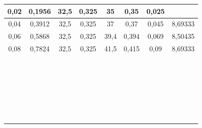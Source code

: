 \begin{tabular}{|*{8}{c|}}
\hline 
0,02 & 0,1956 & 32,5 & 0,325 & 35 & 0,35 & 0,025 &  \\ \hline 
 0,04 & 0,3912 & 32,5 & 0,325 & 37 & 0,37 & 0,045 & 8,69333 \\ \hline 
 0,06 & 0,5868 & 32,5 & 0,325 & 39,4 & 0,394 & 0,069 & 8,50435 \\ \hline 
 0,08 & 0,7824 & 32,5 & 0,325 & 41,5 & 0,415 & 0,09 & 8,69333 \\ \hline 
  &  &  &  &  &  &  &  \\ \hline 
  &  &  &  &  &  &  &  \\ \hline 
  &  &  &  &  &  &  &  \\ \hline 
  &  &  &  &  &  &  &  \\ \hline 
  &  &  &  &  &  &  &  \\ \hline 
  &  &  &  &  &  &  &  \\ \hline 
  &  &  &  &  &  &  &  \\ \hline 
  &  &  &  &  &  &  &  \\ \hline 
  &  &  &  &  &  &  &  \\ \hline 
  &  &  &  &  &  &  &  \\ \hline 
  &  &  &  &  &  &  &  \\ \hline 
  &  &  &  &  &  &  &  \\ \hline 
  &  &  &  &  &  &  &  \\ \hline 
  &  &  &  &  &  &  &  \\ \hline 
  &  &  &  &  &  &  &  \\ \hline 
  &  &  &  &  &  &  &  \\ \hline 
  &  &  &  &  &  &  &  \\ \hline 
  &  &  &  &  &  &  &  \\ \hline 
  &  &  &  &  &  &  &  \\ \hline 
  &  &  &  &  &  &  &  \\ \hline 
  &  &  &  &  &  &  &  \\ \hline 
  &  &  &  &  &  &  &  \\ \hline 
  &  &  &  &  &  &  &  \\ \hline 
  &  &  &  &  &  &  &  \\ \hline 
  &  &  &  &  &  &  &  \\ \hline 
  &  &  &  &  &  &  &  \\ \hline 
 \end{tabular} 
